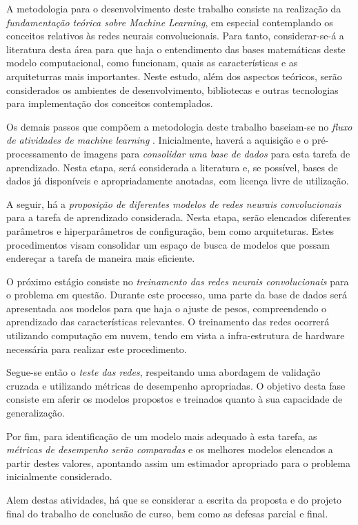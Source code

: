 A metodologia para o desenvolvimento deste trabalho consiste na realização da \emph{fundamentação teórica sobre Machine Learning}, em especial contemplando os conceitos relativos às redes neurais convolucionais. Para tanto, considerar-se-á a literatura desta área para que haja o entendimento das bases matemáticas deste modelo computacional, como funcionam, quais as características e as arquiteturras mais importantes. Neste estudo, além dos aspectos teóricos, serão considerados os ambientes de desenvolvimento, bibliotecas e outras tecnologias para implementação dos conceitos contemplados.

Os demais passos que compõem a metodologia deste trabalho baseiam-se no \emph{fluxo de atividades de machine learning} \cite{marsland2015machine}. Inicialmente, haverá a aquisição e o pré-processamento de imagens para \emph{consolidar uma base de dados} para esta tarefa de aprendizado. Nesta etapa, será considerada a literatura e, se possível, bases de dados já disponíveis e apropriadamente anotadas, com licença livre de utilização.

A seguir, há a \emph{proposição de diferentes modelos de redes neurais convolucionais} para a tarefa de aprendizado considerada. Nesta etapa, serão elencados diferentes parâmetros e hiperparâmetros de configuração, bem como arquiteturas. Estes procedimentos visam consolidar um espaço de busca de modelos que possam endereçar a tarefa de maneira mais eficiente.

O próximo estágio consiste no \emph{treinamento das redes neurais convolucionais} para o problema em questão. Durante este processo, uma parte da base de dados será apresentada aos modelos para que haja o ajuste de pesos, compreendendo o aprendizado das características relevantes. O treinamento das redes ocorrerá utilizando computação em nuvem, tendo em vista a infra-estrutura de hardware necessária para realizar este procedimento.

Segue-se então o \emph{teste das redes}, respeitando uma abordagem de validação cruzada e utilizando métricas de desempenho apropriadas. O objetivo desta fase consiste em aferir os modelos propostos e treinados quanto à sua capacidade de generalização.

Por fim, para identificação de um modelo mais adequado à esta tarefa, as \emph{métricas de desempenho serão comparadas} e os melhores modelos elencados a partir destes valores, apontando assim um estimador apropriado para o problema inicialmente considerado.

Alem destas atividades, há que se considerar a escrita da proposta e do projeto final do trabalho de conclusão de curso, bem como as defesas parcial e final.
